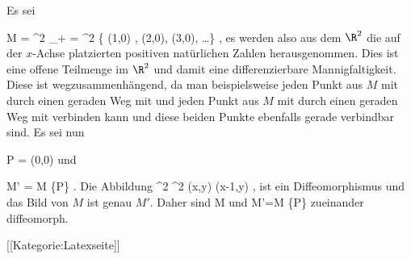 Es sei

\mavergleichskettedisp
{\vergleichskette
{M
}
{ =} { \R^2 \setminus \N_+
}
{ =} { \R^2 \setminus \{ (1,0) , (2,0), (3,0), \ldots  \}
}
{ } {
}
{ } {
}
}
{}{}{,}
es werden also aus dem $\R^2$ die auf der $x$-Achse platzierten positiven natürlichen Zahlen herausgenommen. Dies ist eine offene Teilmenge im $\R^2$ und damit eine differenzierbare Mannigfaltigkeit. Diese ist wegzusammenhängend, da man beispielsweise jeden Punkt aus $M$ mit
 durch einen geraden Weg mit
 und jeden Punkt aus $M$ mit
 durch einen geraden Weg mit
 verbinden kann und diese beiden Punkte ebenfalls gerade verbindbar sind. Es sei nun

\mavergleichskettedisp
{\vergleichskette
{P
}
{ =} { (0,0)
}
{ } {
}
{ } {
}
{ } {
}
}
{}{}{}
und

\mavergleichskettedisp
{\vergleichskette
{M'
}
{ =} { M \setminus \{P\}
}
{ } {
}
{ } {
}
{ } {
}
}
{}{}{.}
Die Abbildung
\maabbeledisp {} {\R^2} {\R^2
} {(x,y)} {(x-1,y)
} {,}
ist
 {} {}
ein Diffeomorphismus und das Bild von $M$ ist genau $M'$. Daher sind
\mathkor {} {M} {und} {M'=M \setminus \{P\}} {}
zueinander diffeomorph.

 [[Kategorie:Latexseite]]
